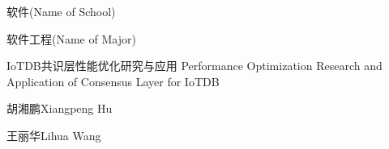 
\school
{软件}{(Name of School)}

\major
{软件工程}{(Name of Major)}

\thesistitle
{IoTDB共识层性能优化研究与应用}
{}
{Performance Optimization Research and Application of Consensus Layer for IoTDB}

\thesisauthor
{胡湘鹏}{Xiangpeng Hu}

\teacher
{王丽华}{Lihua Wang}






